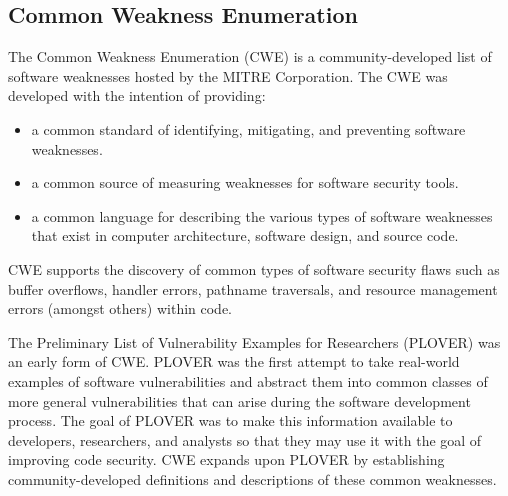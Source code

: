 \documentclass{sig-alternate}
\begin{document}
\subsection{Common Weakness Enumeration}
The Common Weakness Enumeration (CWE) \cite{mitre2006cwe} is a community-developed list of software weaknesses hosted by the MITRE Corporation. The CWE was developed with the intention of providing:

\begin{itemize}
\item a common standard of identifying, mitigating, and preventing software weaknesses.
\item a common source of measuring weaknesses for software security tools.
\item a common language for describing the various types of software weaknesses that exist in computer architecture, software design, and source code.
\end{itemize}

CWE supports the discovery of common types of software security flaws such as buffer overflows, handler errors, pathname traversals, and resource management errors (amongst others) within code.


The Preliminary List of Vulnerability Examples for Researchers (PLOVER) \cite{christey2005plover} was an early form of CWE. PLOVER was the first attempt to take real-world examples of software vulnerabilities and abstract them into common classes of more general vulnerabilities that can arise during the software development process. The goal of PLOVER was to make this information available to developers, researchers, and analysts so that they may use it with the goal of improving code security. CWE expands upon PLOVER by establishing community-developed definitions and descriptions of these common weaknesses.
\end{document}

